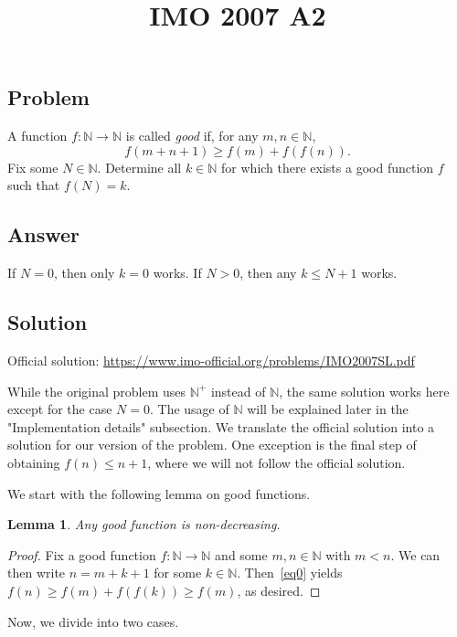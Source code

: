 \documentclass{article}
\title{IMO 2007 A2}
\author{}
\date{}
\newcommand{\N}{\mathbb{N}}
\newtheorem{lemma}{Lemma}
\begin{document}
\maketitle



\subsection*{Problem}

A function $f : \N \to \N$ is called \textit{good} if, for any $m, n \in \N$,
\[ f(m + n + 1) \geq f(m) + f(f(n)). \tag{*}\label{eq0} \]
Fix some $N \in \N$.
Determine all $k \in \N$ for which there exists a good function $f$ such that $f(N) = k$.



\subsection*{Answer}

If $N = 0$, then only $k = 0$ works.
If $N > 0$, then any $k \leq N + 1$ works.



\subsection*{Solution}

Official solution: \url{https://www.imo-official.org/problems/IMO2007SL.pdf}

While the original problem uses $\N^+$ instead of $\N$, the same solution works here except for the case $N = 0$.
The usage of $\N$ will be explained later in the "Implementation details" subsection.
We translate the official solution into a solution for our version of the problem.
One exception is the final step of obtaining $f(n) \leq n + 1$, where we will not follow the official solution.

We start with the following lemma on good functions.

\begin{lemma}\label{2007a2-1}
Any good function is non-decreasing.
\end{lemma}
\begin{proof}
Fix a good function $f : \N \to \N$ and some $m, n \in \N$ with $m < n$.
We can then write $n = m + k + 1$ for some $k \in \N$.
Then~\eqref{eq0} yields $f(n) \geq f(m) + f(f(k)) \geq f(m)$, as desired.
\end{proof}

Now, we divide into two cases.
\end{document}
